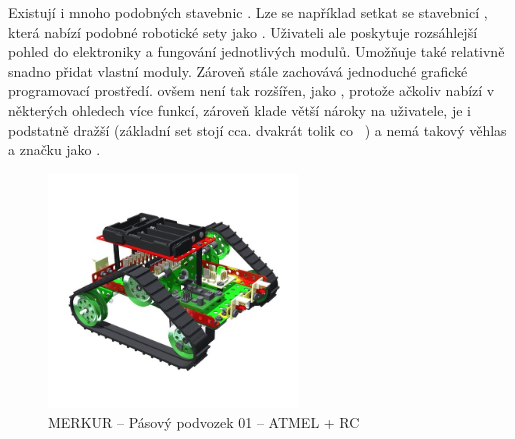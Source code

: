 
Existují i mnoho podobných stavebnic \cite{intorobotics_BestAlternativesToLegoMindstormsKits}. 
Lze se například setkat se stavebnicí \fischerT, která nabízí podobné robotické sety jako \lego{ }\cite{fischertechnik_ROBOTICS}. 
Uživateli ale poskytuje rozsáhlejší pohled do elektroniky a fungování jednotlivých modulů. 
Umožňuje také relativně snadno přidat vlastní moduly.
Zároveň stále zachovává jednoduché grafické programovací prostředí. 
\FischerT{ }ovšem není tak rozšířen, jako \legoM, protože ačkoliv nabízí v některých ohledech více funkcí, zároveň klade větší nároky na uživatele, je i podstatně dražší (základní set \cite{fischertechnik_HelagoEshop_ROBOTICS-TXT-COMPETITION-SET} stojí cca. dvakrát tolik co ~\cite{lego_eduxeEshop_CoreSet}) a nemá takový věhlas a značku jako \lego.



\begin{figure}[h]
 	\centering
	\includegraphics[width=250px]{images/MERKUR_Pasovy-podvozek-01_ATMEL+RC.jpg}
		\caption[MERKUR -- Pásový podvozek 01 -- ATMEL + RC]{MERKUR -- Pásový podvozek 01 -- ATMEL + RC\protect\footnotemark}
	\label{fig:MERKUR_Pasovy-podvozek-01_ATMEL+RC}
\end{figure}

